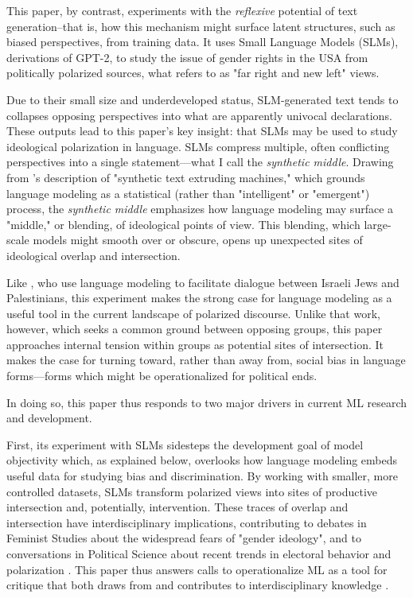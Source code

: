 \documentclass[anonymous,review]{acmart}
\begin{document}
This paper, by contrast, experiments with the \textit{reflexive} potential of text generation--that is, how this mechanism might surface latent structures, such as biased perspectives, from training data. It uses Small Language Models (SLMs), derivations of GPT-2, to study the issue of gender rights in the USA from politically polarized sources, what \citet{bornschier_2021} refers to as "far right and new left" views.

Due to their small size and underdeveloped status, SLM-generated text tends to collapses opposing perspectives into what are apparently univocal declarations. These outputs lead to this paper's key insight: that SLMs may be used to study ideological polarization in language. SLMs compress multiple, often conflicting perspectives into a single statement---what I call the \textit{synthetic middle}. Drawing from \citet{bender_2025}'s description of "synthetic text extruding machines," which grounds language modeling as a statistical (rather than "intelligent" or "emergent") process, the \textit{synthetic middle} emphasizes how language modeling may surface a "middle," or blending, of ideological points of view. This blending, which large-scale models might smooth over or obscure, opens up unexpected sites of ideological overlap and intersection. 

Like \citet{konya_2025}, who use language modeling to facilitate dialogue between Israeli Jews and Palestinians, this experiment makes the strong case for language modeling as a useful tool in the current landscape of polarized discourse. Unlike that work, however, which seeks a common ground between opposing groups, this paper approaches internal tension within groups as potential sites of intersection. It makes the case for turning toward, rather than away from, social bias in language forms---forms which might be operationalized for political ends.

In doing so, this paper thus responds to two major drivers in current ML research and development.

First, its experiment with SLMs sidesteps the development goal of model objectivity which, as explained below, overlooks how language modeling embeds useful data for studying bias and discrimination. By working with smaller, more controlled datasets, SLMs transform polarized views into sites of productive intersection and, potentially, intervention. These traces of overlap and intersection have interdisciplinary implications, contributing to debates in Feminist Studies about the widespread fears of "gender ideology", and to conversations in Political Science about recent trends in electoral behavior and polarization \citep{butler_2024,bornschier_2021}. This paper thus answers calls to operationalize ML as a tool for critique that both draws from and contributes to interdisciplinary knowledge \citep{wanga_2025,birhane_2022,devinney_2022}.
\end{document}
